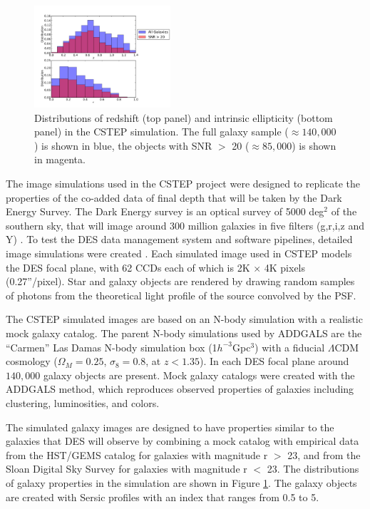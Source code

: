 \begin{figure}
 \centering  %
  \includegraphics[width=0.45\textwidth]{fig/Out_hist_v2_truth.pdf} 
  \caption{Distributions of redshift (top panel) and intrinsic ellipticity (bottom panel) in the CSTEP simulation.
The full galaxy sample ($\approx140,000$) is shown in blue, the objects with SNR $>$ 20 ($\approx85,000$) is shown in magenta. }
\label{fig:Galprop}
\end{figure}

The image simulations used in the CSTEP project were designed to 
replicate the properties of the co-added data of final depth that will be taken by the 
Dark Energy Survey. The Dark Energy survey is an optical survey of
5000 deg$^2$ of the southern sky, that will image around 300 million
galaxies in five filters (g,r,i,z and Y) \citep{Klaus}. To test the DES
data management system and software pipelines, detailed image simulations were created \citep{DESsim}. Each simulated image used in CSTEP models the DES focal plane,
with 62 CCDs each of which is 2K $\times$ 4K pixels (0.27''/pixel). Star and galaxy objects are
rendered by drawing random samples of
photons from the theoretical light profile of the source convolved 
by the PSF.

The CSTEP simulated images are based on an N-body simulation with a realistic mock galaxy catalog.
The parent N-body simulations used by ADDGALS are the ``Carmen'' Las Damas \citep{LasDamas}
N-body simulation box (1$h^{-3}$Gpc$^3$) with a fiducial $\Lambda$CDM cosmology ($\Omega_M=0.25$, $\sigma_8 = 0.8$, at $z< 1.35$). In each DES focal plane around $140,000$ galaxy objects are
present. Mock galaxy catalogs were
created with the ADDGALS  method, which reproduces observed properties
of galaxies including clustering, luminosities, and colors. 

The simulated galaxy images are designed to have properties similar to
the galaxies that DES will observe by combining a mock
catalog with empirical data from the HST/GEMS catalog for galaxies
with magnitude r $ > $ 23, and from the Sloan Digital Sky Survey for
galaxies with magnitude r $ < $ 23. The distributions of galaxy
properties in the simulation are shown in Figure \ref{fig:Galprop}. 
The galaxy objects are created with Sersic profiles with an
index that ranges from 0.5 to 5.

